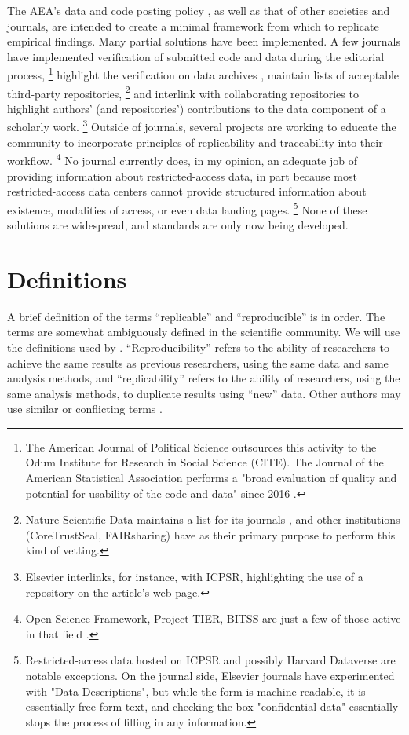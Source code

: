 \documentclass[AEJ]{AEA}
\begin{document}
The \ac{AEA}'s data and code posting policy \citep{American_Economic_Association2008-az}, as well as that of other societies and journals, are intended to create a minimal framework from which to replicate empirical findings. Many partial solutions have been implemented. A few journals have implemented verification of submitted code and data during the editorial process,%
\footnote{The American Journal of Political Science outsources this activity to the Odum Institute for Research in Social Science (CITE). The Journal of the American Statistical Association performs a "broad evaluation of quality and potential for usability of the code and data" since 2016 \citep{Stodden2016-uc}.}
highlight the verification on data archives \citep{Open_Science_Framework2017-zc}, maintain lists of acceptable third-party repositories,%
\footnote{Nature Scientific Data maintains a list for its journals \citep{Nature_Scientific_Data2016-hl}, and other institutions (CoreTrustSeal, FAIRsharing) have as their primary purpose to perform this kind of vetting.} 
and interlink with collaborating repositories to highlight authors' (and repositories') contributions to the data component of a scholarly work.%
\footnote{Elsevier interlinks, for instance, with ICPSR, highlighting the use of a repository on the article's web page.}
Outside of journals, several projects are working to educate the community to incorporate principles of replicability and traceability into their workflow.%
\footnote{Open Science Framework, Project TIER, BITSS are just a few of those active in that field \citep{Gentzkow2014-va,Wilson2016-bt}.}
No journal currently does, in my opinion, an adequate job of providing information about restricted-access data, in part because most restricted-access data centers cannot provide structured information about existence, modalities of access, or even data landing pages.%
\footnote{Restricted-access data hosted on ICPSR and possibly Harvard Dataverse are notable exceptions. On the journal side, Elsevier journals have experimented with "Data Descriptions", but while the form is machine-readable, it is essentially free-form text, and checking the box "confidential data" essentially stops the process of filling in any information.} 
None of these solutions are widespread, and standards are only now being developed.

\section{Definitions}
A brief definition of the terms ``replicable'' and ``reproducible'' is in order. The terms are somewhat ambiguously defined in the scientific community. We will use the definitions used by \cite{Bollen2015-vb}. ``Reproducibility''  refers to the ability of researchers to achieve the same results as previous researchers, using the same data and same analysis methods, and ``replicability''  refers to the ability of researchers, using the same analysis methods, to duplicate results using ``new'' data. Other authors may use similar or conflicting terms \citep{Clemens2017-zj}. 
\end{document}
